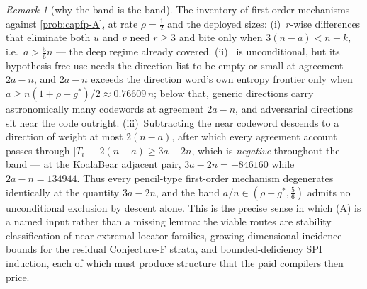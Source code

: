 \documentclass[11pt]{article}
\theoremstyle{definition}
\theoremstyle{remark}
\newtheorem{remark}[remark]{Remark}
\begin{document}
\begin{remark}[why the band is the band]\label{rem:capfp-band-obstruction}
The inventory of first-order mechanisms against \cref{prob:capfp-A}, at rate $\rho=\tfrac12$ and the deployed sizes:
\textup{(i)}\ $r$-wise differences that eliminate both $u$ and $v$ need $r\ge3$ and bite only when $3(n-a)<n-k$, i.e.\ $a>\tfrac56n$ --- the deep regime already covered.
\textup{(ii)}\  is unconditional, but its hypothesis-free use needs the direction list to be empty or small at agreement $2a-n$, and $2a-n$ exceeds the direction word's own entropy frontier only when $a\ge n(1+\rho+g^*)/2\approx0.76609\,n$; below that, generic directions carry astronomically many codewords at agreement $2a-n$, and adversarial directions sit near the code outright.
\textup{(iii)}\ Subtracting the near codeword descends to a direction of weight at most $2(n-a)$, after which every agreement account passes through $|T_i|-2(n-a)\ge3a-2n$, which is \emph{negative} throughout the band --- at the KoalaBear adjacent pair, $3a-2n=-846160$ while $2a-n=134944$.
Thus every pencil-type first-order mechanism degenerates identically at the quantity $3a-2n$, and the band $a/n\in(\rho+g^*,\tfrac56)$ admits no unconditional exclusion by descent alone.  This is the precise sense in which \textup{(A)} is a named input rather than a missing lemma: the viable routes are stability classification of near-extremal locator families, growing-dimensional incidence bounds for the residual Conjecture-F strata, and bounded-deficiency SPI induction, each of which must produce structure that the paid compilers then price.
\end{remark}
\end{document}
